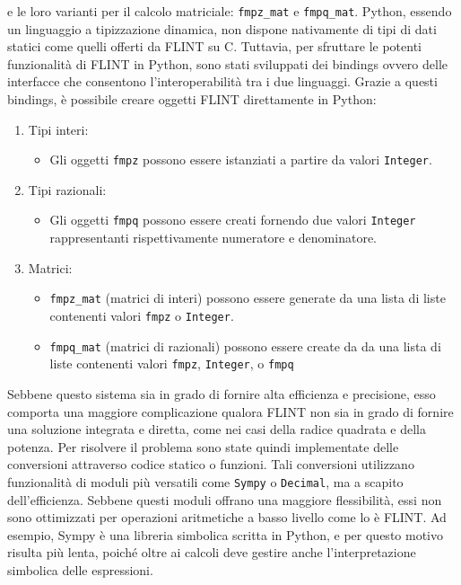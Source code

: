 e le loro varianti per il calcolo matriciale: \texttt{fmpz\_mat} e \texttt{fmpq\_mat}. 
Python, essendo un linguaggio a tipizzazione dinamica, non dispone nativamente di tipi 
di dati statici come quelli offerti da FLINT su C. Tuttavia, per sfruttare le potenti 
funzionalità di FLINT in Python, sono stati sviluppati dei bindings ovvero delle
interfacce che consentono l'interoperabilità tra i due linguaggi.
Grazie a questi bindings, è possibile creare oggetti FLINT direttamente in Python:
\begin{enumerate}
    \item Tipi interi:
    \begin{itemize}
        \item Gli oggetti \texttt{fmpz} possono essere istanziati a partire da valori 
        \texttt{Integer}.
    \end{itemize}
    \item Tipi razionali:
    \begin{itemize}
        \item Gli oggetti \texttt{fmpq} possono essere creati fornendo due valori 
        \texttt{Integer} rappresentanti rispettivamente numeratore e denominatore.
    \end{itemize}
    \item Matrici:
    \begin{itemize}
        \item \texttt{fmpz\_mat} (matrici di interi) possono essere generate da una 
        lista di liste 
        contenenti valori \texttt{fmpz} o \texttt{Integer}.
        \item \texttt{fmpq\_mat} (matrici di razionali) possono essere create da da una 
        lista di liste 
        contenenti valori \texttt{fmpz}, \texttt{Integer}, o \texttt{fmpq}
    \end{itemize}
\end{enumerate}
Sebbene questo sistema sia in grado di fornire alta efficienza e precisione, esso comporta
una maggiore complicazione qualora FLINT non sia in grado di fornire una soluzione integrata 
e diretta, come
nei casi della radice quadrata e della potenza. Per risolvere il problema sono
state quindi implementate delle conversioni attraverso codice statico o funzioni.
Tali conversioni utilizzano funzionalità di moduli più versatili come \texttt{Sympy} o \texttt{Decimal}, 
ma a scapito dell'efficienza. Sebbene questi moduli offrano una 
maggiore flessibilità, essi non sono ottimizzati per operazioni aritmetiche a basso livello 
come lo è FLINT. Ad esempio, Sympy è una libreria simbolica scritta in Python, e per 
questo motivo risulta più lenta, poiché oltre ai calcoli deve gestire anche 
l'interpretazione simbolica delle espressioni.

